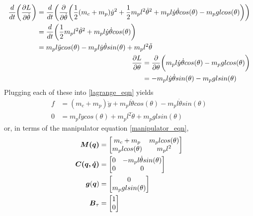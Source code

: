 \begin{subequations}
\begin{align}
\begin{split}
	\frac{d}{dt} \bigg{(} \frac{\partial L}{\partial \dot{\theta}} \bigg{)}
	&= \frac{d}{dt} \bigg{(} \frac{\partial}{\partial \dot{\theta}} \bigg{(}
	\frac{1}{2}(m_{c} + m_{p})\dot{y}^{2} + \frac{1}{2}m_{p}l^{2}\dot{\theta}^{2}
		+ m_{p}l\dot{y}\dot{\theta}cos(\theta) -  m_{p}glcos(\theta)
	\bigg{)} \bigg{)}
	\\
	&= \frac{d}{dt} \bigg{(}
	\frac{1}{2}m_{p}l^{2}\dot{\theta}^{2} + m_{p}l\dot{y}\dot{\theta}cos(\theta)
	\bigg{)}
	\\
	&= m_{p}l\ddot{y}cos(\theta) - m_{p}l\dot{y}\dot{\theta}sin(\theta) + m_{p}l^{2}\ddot{\theta}
\end{split}
	\\
\begin{split}
	\frac{\partial L}{\partial \theta}
	&= \frac{\partial}{\partial \theta} \bigg{(}
	m_{p}l\dot{y}\dot{\theta}cos(\theta) - m_{p}glcos(\theta)
	 \bigg{)}
	\\
	&= -m_{p}l\dot{y}\dot{\theta}sin(\theta) - m_{p}glsin(\theta)
\end{split}
\end{align}
\end{subequations}
Plugging each of these into \eqref{lagrange_eqn} yields
\begin{subequations}
\begin{align}
	f &= (m_{c} + m_{p})\ddot{y} + m_{p}l\ddot{\theta}cos(\theta) - m_{p}l\dot{\theta}sin(\theta)\\
	0 &= m_{p}l\ddot{y}cos(\theta) + m_{p}l^{2}\ddot{\theta} + m_{p}glsin(\theta)
\end{align}
\end{subequations}
or, in terms of the manipulator equation \eqref{manipulator_eqn},
\begin{subequations}
\begin{align}
	\vb*{M(q)} &= \begin{bmatrix}
		m_{c} + m_{p} & m_{p}lcos(\theta)\\
		m_{p}lcos(\theta) & m_{p}l^{2}\\
	\end{bmatrix}\\
	\vb*{C(q, \dot{q})} &= \begin{bmatrix}
		0 & -m_{p}l\dot{\theta}sin(\theta)\\
		0 & 0\\
	\end{bmatrix}\\
	\vb*{g}(\vb*{q}) &= \begin{bmatrix} 0 \\ m_{p}glsin(\theta) \end{bmatrix}\\
	\vb*{B}_{\tau} &= \begin{bmatrix} 1\\ 0 \end{bmatrix}
\end{align}
\end{subequations}

